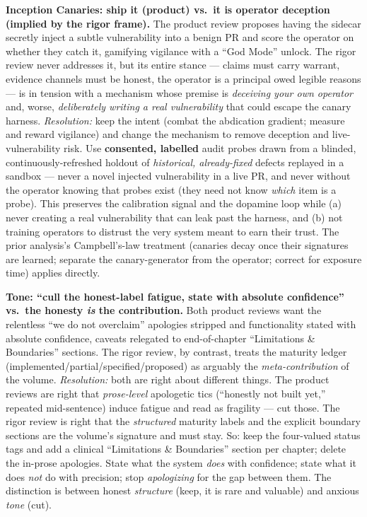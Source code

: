 \documentclass[11pt,a4paper]{article}
\begin{document}
\begin{adj}\textbf{Inception Canaries: ship it (product) vs.\ it is operator deception (implied by the rigor frame).} The product review proposes having the sidecar secretly inject a subtle vulnerability into a benign PR and score the operator on whether they catch it, gamifying vigilance with a ``God Mode'' unlock. The rigor review never addresses it, but its entire stance --- claims must carry warrant, evidence channels must be honest, the operator is a principal owed legible reasons --- is in tension with a mechanism whose premise is \emph{deceiving your own operator} and, worse, \emph{deliberately writing a real vulnerability} that could escape the canary harness. \emph{Resolution:} keep the intent (combat the abdication gradient; measure and reward vigilance) and change the mechanism to remove deception and live-vulnerability risk. Use \textbf{consented, labelled} audit probes drawn from a blinded, continuously-refreshed holdout of \emph{historical, already-fixed} defects replayed in a sandbox --- never a novel injected vulnerability in a live PR, and never without the operator knowing that probes exist (they need not know \emph{which} item is a probe). This preserves the calibration signal and the dopamine loop while (a) never creating a real vulnerability that can leak past the harness, and (b) not training operators to distrust the very system meant to earn their trust. The prior analysis's Campbell's-law treatment (canaries decay once their signatures are learned; separate the canary-generator from the operator; correct for exposure time) applies directly.
\end{adj}

\begin{adj}\textbf{Tone: ``cull the honest-label fatigue, state with absolute confidence'' vs.\ the honesty \emph{is} the contribution.} Both product reviews want the relentless ``we do not overclaim'' apologies stripped and functionality stated with absolute confidence, caveats relegated to end-of-chapter ``Limitations \& Boundaries'' sections. The rigor review, by contrast, treats the maturity ledger (implemented/partial/specified/proposed) as arguably the \emph{meta-contribution} of the volume. \emph{Resolution:} both are right about different things. The product reviews are right that \emph{prose-level} apologetic tics (``honestly not built yet,'' repeated mid-sentence) induce fatigue and read as fragility --- cut those. The rigor review is right that the \emph{structured} maturity labels and the explicit boundary sections are the volume's signature and must stay. So: keep the four-valued status tags and add a clinical ``Limitations \& Boundaries'' section per chapter; delete the in-prose apologies. State what the system \emph{does} with confidence; state what it does \emph{not} do with precision; stop \emph{apologizing} for the gap between them. The distinction is between honest \emph{structure} (keep, it is rare and valuable) and anxious \emph{tone} (cut).
\end{adj}
\end{document}
